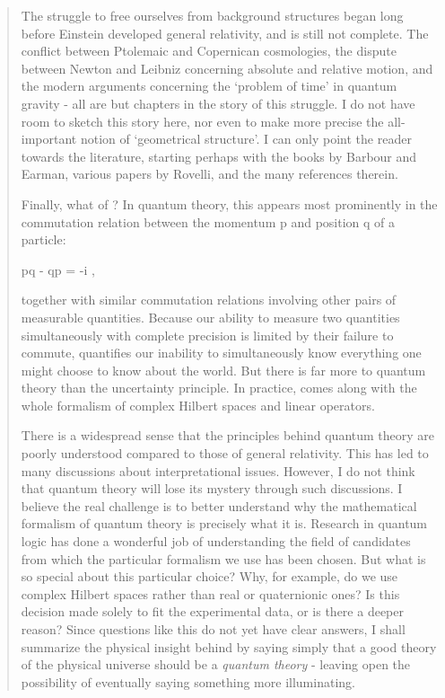 \begin{quote}
The struggle to free ourselves from background structures began long
before Einstein developed general relativity, and is still not complete.
The conflict between Ptolemaic and Copernican cosmologies, the dispute
between Newton and Leibniz concerning absolute and relative motion, and
the modern arguments concerning the `problem of time' in quantum gravity
- all are but chapters in the story of this struggle.  I do not have
room to sketch this story here, nor even to make more precise the
all-important notion of `geometrical structure'.  I can only point the
reader towards the literature, starting perhaps with the books by
Barbour and Earman, various papers by Rovelli, and the many references 
therein.  

Finally, what of \hbar ?  In quantum theory, this appears most 
prominently in the commutation relation between the momentum p and
position q of a particle: 

                        pq - qp = -i \hbar , 

together with similar commutation relations involving other pairs of
measurable quantities.   Because our ability to measure two quantities
simultaneously with complete precision is limited by their failure to
commute, \hbar  quantifies our inability to simultaneously know
everything one might choose to know about the world.  But there is far
more to quantum theory than the uncertainty principle.  In practice,
\hbar  comes along with the whole formalism of complex Hilbert spaces
and linear operators.  

There is a widespread sense that the principles behind quantum theory
are poorly understood compared to those of general relativity.  This has
led to many discussions about interpretational issues.  However, I do
not think that quantum theory will lose its mystery through such
discussions.   I believe the real challenge is to better understand why
the mathematical formalism of quantum theory is precisely what it is. 
Research in quantum logic has done a wonderful job of understanding the
field of candidates from which the particular formalism we use has been
chosen.  But what is so special about this particular choice?  Why, for
example, do we use complex Hilbert spaces rather than real or
quaternionic ones?  Is this decision made solely to fit the experimental
data, or is there a deeper reason?  Since questions like this do not yet
have clear answers, I shall summarize the physical insight behind \hbar 
by saying simply that a good theory of the physical universe should be a
\emph{quantum theory} - leaving open the possibility of eventually saying
something more illuminating.


\end{quote}
